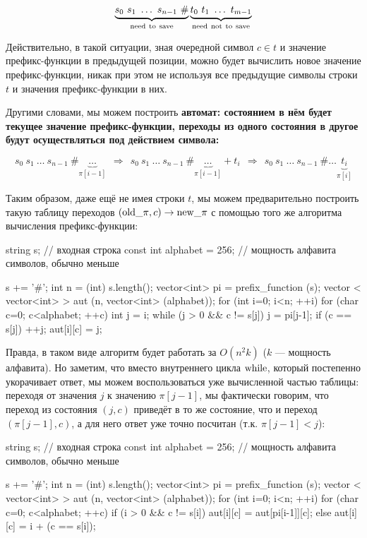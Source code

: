 $$ \underbrace{s_0\ s_1\ \ldots\ s_{n-1}\ \#}_{\rm need\ to\ save} \underbrace{t_0\ t_1\ \ldots\ t_{m-1}}_{\rm need\ not\ to\ save} $$

Действительно, в такой ситуации, зная очередной символ $c \in t$ и значение префикс-функции в предыдущей позиции, можно будет вычислить новое значение префикс-функции, никак при этом не используя все предыдущие символы строки $t$ и значения префикс-функции в них.

Другими словами, мы можем построить \bf{автомат}: состоянием в нём будет текущее значение префикс-функции, переходы из одного состояния в другое будут осуществляться под действием символа:

$$ s_0\ s_1\ \ldots\ s_{n-1}\ \# \underbrace{\ldots}_{\pi[i-1]}\ \ \Longrightarrow\ \ s_0\ s_1\ \ldots\ s_{n-1}\ \# \underbrace{\ldots}_{\pi[i-1]} + t_i\ \ \Longrightarrow\ \ s_0\ s_1\ \ldots\ s_{n-1}\ \# \ldots \underbrace{t_i}_{\pi[i]} $$

Таким образом, даже ещё не имея строки $t$, мы можем предварительно построить такую таблицу переходов $({\rm old}\_\pi,c) \rightarrow {\rm new}\_\pi$ с помощью того же алгоритма вычисления префикс-функции:

\code
string s; // входная строка
const int alphabet = 256; // мощность алфавита символов, обычно меньше

s += '#';
int n = (int) s.length();
vector<int> pi = prefix_function (s);
vector < vector<int> > aut (n, vector<int> (alphabet));
for (int i=0; i<n; ++i)
	for (char c=0; c<alphabet; ++c) {
		int j = i;
		while (j > 0 && c != s[j])
			j = pi[j-1];
		if (c == s[j])  ++j;
		aut[i][c] = j;
	}
\endcode

Правда, в таком виде алгоритм будет работать за $O(n^2 k)$ ($k$ --- мощность алфавита). Но заметим, что вместо внутреннего цикла $\rm while$, который постепенно укорачивает ответ, мы можем воспользоваться уже вычисленной частью таблицы: переходя от значения $j$ к значению $\pi[j-1]$, мы фактически говорим, что переход из состояния $(j, c)$ приведёт в то же состояние, что и переход $(\pi[j-1], c)$, а для него ответ уже точно посчитан (т.к. $\pi[j-1] < j$):

\code
string s; // входная строка
const int alphabet = 256; // мощность алфавита символов, обычно меньше

s += '#';
int n = (int) s.length();
vector<int> pi = prefix_function (s);
vector < vector<int> > aut (n, vector<int> (alphabet));
for (int i=0; i<n; ++i)
	for (char c=0; c<alphabet; ++c)
		if (i > 0 && c != s[i])
			aut[i][c] = aut[pi[i-1]][c];
		else
			aut[i][c] = i + (c == s[i]);
\endcode

